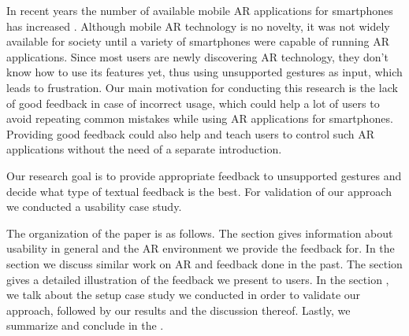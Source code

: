 \documentclass[11pt, a4paper]{article}
\begin{document}
		In recent years the number of available mobile \ac{AR} applications for smartphones 
		has increased \cite{Tractica2017}. Although mobile \ac{AR} technology is no novelty, it was not widely available for 
		society until a variety of smartphones were capable of running AR applications. Since most 
		users are newly discovering \ac{AR} technology, they don't know how to use its features yet, thus using 
		unsupported gestures as input, which leads to frustration. Our main motivation for conducting this 
		research is the lack of good feedback in case of incorrect usage, which could help a lot of users to 
		avoid repeating common mistakes while using \ac{AR} applications for smartphones. Providing good feedback 
		could also help and teach users to control such \ac{AR} applications without the need of a separate introduction.

		Our research goal is to provide appropriate feedback to unsupported gestures and decide
		what type of textual feedback is the best. For validation of our approach we conducted a usability case study.

		The organization of the paper is as follows. The section  gives information about
		usability in general and the \ac{AR} environment we provide the feedback for. In the section  we discuss similar work on \ac{AR} and feedback done in the past. The  section
		gives a detailed illustration of the feedback we present to users. In the section , we
		talk about the setup case study we conducted in order to validate our approach, followed by
		our results and the discussion thereof. Lastly, we summarize and conclude in the .
\end{document}
